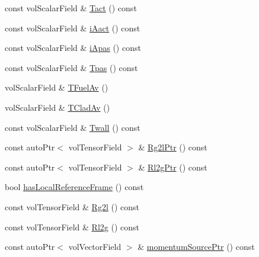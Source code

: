 \begin{DoxyCompactItemize}
const vol\+Scalar\+Field \& \hyperlink{classFoam_1_1structure_abebe2d39aa018c9e0279a27bf5e201f6}{Tact} () const
\item 
const vol\+Scalar\+Field \& \hyperlink{classFoam_1_1structure_afedf45f11522786f95df7228a3f2d35a}{i\+Aact} () const
\item 
const vol\+Scalar\+Field \& \hyperlink{classFoam_1_1structure_acba35586ab8aff24636d1147ec8878a9}{i\+Apas} () const
\item 
const vol\+Scalar\+Field \& \hyperlink{classFoam_1_1structure_aee77d3c69364c93087597bb03ca5093b}{Tpas} () const
\item 
vol\+Scalar\+Field \& \hyperlink{classFoam_1_1structure_a814968a5ac76932267a7dfbb719addb1}{T\+Fuel\+Av} ()
\item 
vol\+Scalar\+Field \& \hyperlink{classFoam_1_1structure_abe4bfe7372120f3a230fe28d058efdf5}{T\+Clad\+Av} ()
\item 
const vol\+Scalar\+Field \& \hyperlink{classFoam_1_1structure_af6b7af3c51ef942fc34f8268c85acdc2}{Twall} () const
\item 
const auto\+Ptr$<$ vol\+Tensor\+Field $>$ \& \hyperlink{classFoam_1_1structure_a96bcfb58cf44353ee1cc244bb6a3733c}{Rg2l\+Ptr} () const
\item 
const auto\+Ptr$<$ vol\+Tensor\+Field $>$ \& \hyperlink{classFoam_1_1structure_a3104e223423d689b72e514aee2850df6}{Rl2g\+Ptr} () const
\item 
bool \hyperlink{classFoam_1_1structure_a5a3d010cf4cd69644e72fa59863407cd}{has\+Local\+Reference\+Frame} () const
\item 
const vol\+Tensor\+Field \& \hyperlink{classFoam_1_1structure_a1badf9a3cb26af2f18f59c7a0c9408fa}{Rg2l} () const
\item 
const vol\+Tensor\+Field \& \hyperlink{classFoam_1_1structure_af8fc9f8f08164248e643e6ba949f5fb0}{Rl2g} () const
\item 
const auto\+Ptr$<$ vol\+Vector\+Field $>$ \& \hyperlink{classFoam_1_1structure_a85d9cfb7d462a6f932057418008ad496}{momentum\+Source\+Ptr} () const
\end{DoxyCompactItemize}
